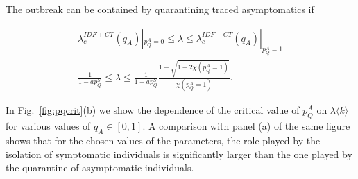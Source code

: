 \documentclass[aps,twocolumn,superscriptaddress,nofootinbib,pre,floatfix]{revtex4-1}
\begin{document}
The outbreak can be contained by quarantining traced asymptomatics if

\begin{align}
    \lambda_c^{IDF+CT}(q_A)|_{p_Q^A=0} \leq \lambda \leq \lambda_c^{IDF+CT}(q_A)|_{p_Q^A=1}\\
    \frac{1}{1-a p_Q^S} \leq \lambda \leq \frac{1}{1-a p_Q^S} \frac{1-\sqrt{1-2 \chi(p_Q^A=1)}}{\chi(p_Q^A=1)}.
    \label{eq:conditions}
\end{align}


In Fig.~\ref{fig:pqcrit}(b) we show the dependence of the critical value
of $p_Q^A$ on $\lambda \langle k \rangle$ for various values of $q_A
\in [0,1]$. A comparison with panel (a) of the same figure shows that
for the chosen values of the parameters, the
role played by the isolation of symptomatic individuals is
significantly larger than the one played by the quarantine of
asymptomatic individuals.


\end{document}

